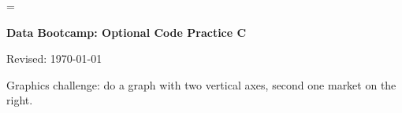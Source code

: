 \documentclass[11pt]{article}
\begin{document}
\parskip=\bigskipamount
\parindent=0.0in
\thispagestyle{empty}


\bigskip\bigskip
\centerline{\Large \bf Data Bootcamp:  Optional Code Practice C}
\centerline{Revised: \today}

Graphics challenge:
do a graph with two vertical axes, second one market on the right. 
\end{document}
